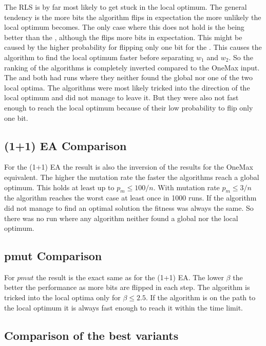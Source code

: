 

The RLS is by far most likely to get stuck in the local optimum.
The general tendency is the more bits the algorithm flips in expectation the more unlikely the local optimum becomes.
The only case where this does not hold is the \RLSN[2] being better than the \RLSR[4], although the \RLSR[4] flips more bits in expectation.
This might be caused by the higher probability for flipping only one bit for the \RLSR[4].
This causes the algorithm to find the local optimum faster before separating $w_1$ and $w_2$.
So the ranking of the algorithms is completely inverted compared to the OneMax input.
The \RLSN[2] and \RLSN[3] both had runs where they neither found the global nor one of the two local optima.
The algorithms were most likely tricked into the direction of the local optimum and did not manage to leave it.
But they were also not fast enough to reach the local optimum because of their low probability to flip only one bit.
\subsection{(1+1) EA Comparison}




For the (1+1) EA the result is also the inversion of the results for the OneMax equivalent.
The higher the mutation rate the faster the algorithms reach a global optimum.
This holds at least up to $p_m\le100/n$.
With mutation rate $p_m\le3/n$ the algorithm reaches the worst case at least once in 1000 runs.
If the algorithm did not manage to find an optimal solution the fitness was always the same.
So there was no run where any algorithm neither found a global nor the local optimum.
\subsection{pmut Comparison}




For $pmut$ the result is the exact same as for the (1+1) EA.
The lower $\beta$ the better the performance as more bits are flipped in each step.
The algorithm is tricked into the local optima only for $\beta\le2.5$.
If the algorithm is on the path to the local optimum it is always fast enough to reach it within the time limit.
\subsection{Comparison of the best variants}


